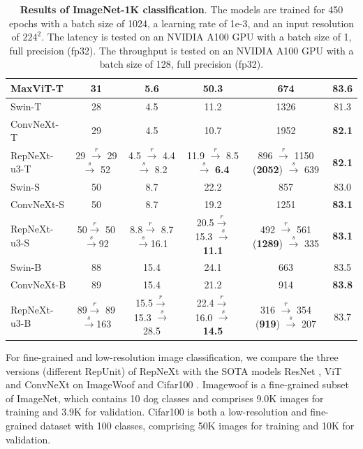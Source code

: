 \documentclass[preprint,12pt]{elsarticle}
\begin{document}
\begin{table}[]
\begin{adjustbox}{center}
{\begin{tabular}{lccccc}
MaxViT-T & 31 & 5.6 & 50.3 & 674 & 83.6 \\ \hline
Swin-T & 28 & 4.5 & 11.2 & 1326 & 81.3 \\
ConvNeXt-T & 29 & 4.5 & 10.7 & 1952 & \textbf{82.1} \\ 
RepNeXt-u3-T & 29 $\stackrel{r}{\rightarrow}$ 29 $\stackrel{s}{\rightarrow}$ 52 & 4.5 $\stackrel{r}{\rightarrow}$ 4.4 $\stackrel{s}{\rightarrow}$ 8.2 & 11.9 $\stackrel{r}{\rightarrow}$ 8.5 $\stackrel{s}{\rightarrow}$ \textbf{6.4} & 896 $\stackrel{r}{\rightarrow}$ 1150 (\textbf{2052})   $\stackrel{s}{\rightarrow}$ 639 & \textbf{82.1} \\ \hline
Swin-S & 50 & 8.7 & 22.2 & 857 & 83.0 \\
ConvNeXt-S & 50 & 8.7 & 19.2 & 1251 & \textbf{83.1} \\ 
RepNeXt-u3-S & 50$\stackrel{r}{\rightarrow}$ 50 $\stackrel{s}{\rightarrow}$92 & 8.8$\stackrel{r}{\rightarrow}$ 8.7 $\stackrel{s}{\rightarrow}$16.1 & 20.5$\stackrel{r}{\rightarrow}$ 15.3 $\stackrel{s}{\rightarrow}$\textbf{11.1} & 492 $\stackrel{r}{\rightarrow}$ 561 (\textbf{1289})   $\stackrel{s}{\rightarrow}$ 335  & \textbf{83.1} \\ \hline
Swin-B & 88 & 15.4 & 24.1 & 663 & 83.5 \\
ConvNeXt-B & 89 & 15.4 & 21.2 & 914 & \textbf{83.8} \\ 
RepNeXt-u3-B & 89$\stackrel{r}{\rightarrow}$ 89 $\stackrel{s}{\rightarrow}$163 & 15.5$\stackrel{r}{\rightarrow}$ 15.3 $\stackrel{s}{\rightarrow}$28.5 & 22.4$\stackrel{r}{\rightarrow}$ 16.0 $\stackrel{s}{\rightarrow}$\textbf{14.5} & 316 $\stackrel{r}{\rightarrow}$ 354 (\textbf{919})   $\stackrel{s}{\rightarrow}$ 207 & 83.7\\ \hline
\end{tabular}}
\end{adjustbox}
\caption{\textbf{Results of ImageNet-1K classification}. The models are trained for 450 epochs with a batch size of 1024, a learning rate of 1e-3, and an input resolution of $224^2$. The latency is tested on an NVIDIA A100 GPU with a batch size of 1, full precision (fp32). The throughput is tested on an NVIDIA A100 GPU with a batch size of 128, full precision (fp32).}\label{table:imagenet}
\end{table}

For fine-grained and low-resolution image classification, we compare the three versions (different RepUnit) of RepNeXt with the SOTA models ResNet \cite{resnet}, ViT \cite{vit} and ConvNeXt \cite{convnext} on ImageWoof \cite{imagewoof} and Cifar100 \cite{cifar}. Imagewoof is a fine-grained subset of ImageNet, which contains 10 dog classes and comprises 9.0K images for training and 3.9K for validation. Cifar100 is both a low-resolution and fine-grained dataset with 100 classes, comprising 50K images for training and 10K for validation.
\end{document}
